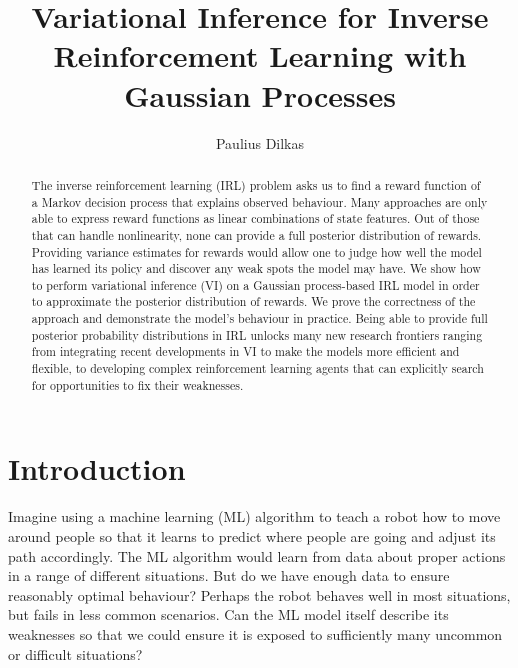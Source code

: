 \documentclass{mpaper}
\begin{document}

\title{Variational Inference for Inverse Reinforcement Learning with Gaussian Processes}
\author{Paulius Dilkas}
\maketitle

\begin{abstract}
  The inverse reinforcement learning (IRL) problem asks us to find a reward
  function of a Markov decision process that explains observed behaviour. Many
  approaches are only able to express reward functions as linear combinations
  of state features. Out of those that can handle nonlinearity, none can provide
  a full posterior distribution of rewards. Providing variance estimates for
  rewards would allow one to judge how well the model has learned its policy and
  discover any weak spots the model may have. We show how to perform variational
  inference (VI) on a Gaussian process-based IRL model in order to approximate
  the posterior distribution of rewards. We prove the correctness of the
  approach and demonstrate the model's behaviour in practice. Being able to
  provide full posterior probability distributions in IRL unlocks many new
  research frontiers ranging from integrating recent developments in VI to make
  the models more efficient and flexible, to developing complex reinforcement
  learning agents that can explicitly search for opportunities to fix their
  weaknesses.
\end{abstract}

\section{Introduction} %

Imagine using a machine learning (ML) algorithm to teach a robot how to move
around people so that it learns to predict where people are going and adjust its
path accordingly. The ML algorithm would learn from data about proper actions in
a range of different situations. But do we have enough data to ensure reasonably
optimal behaviour? Perhaps the robot behaves well in most situations, but fails
in less common scenarios. Can the ML model itself describe its weaknesses so
that we could ensure it is exposed to sufficiently many uncommon or difficult
situations?
\end{document}
